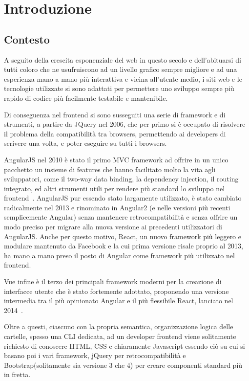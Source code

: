 \chapter{Introduzione}\label{cap:introduzione}

\section{Contesto}\label{sez:contesto}

A seguito della crescita esponenziale del web in questo secolo e dell'abituarsi di tutti coloro che ne usufruiscono ad un livello grafico sempre migliore e ad una esperienza mano a mano pi\`u interattiva e vicina all'utente medio, i siti web e le tecnologie utilizzate si sono adattati per permettere uno sviluppo sempre pi\`u rapido di codice pi\`u facilmente testabile e mantenibile.

Di conseguenza nel frontend si sono susseguiti una serie di framework e di strumenti, a partire da JQuery\cite{jquery} nel 2006, che per primo si \`e occupato di risolvere il problema della compatibilit\`a tra browsers, permettendo ai developers di scrivere una volta, e poter eseguire su tutti i browsers.

AngularJS nel 2010 \`e stato il primo MVC framework ad offrire in un unico pacchetto un insieme di features che hanno facilitato molto la vita agli sviluppatori, come il two-way data binding, la dependency injection, il routing integrato, ed altri strumenti utili per rendere pi\`u standard lo sviluppo nel frontend~\cite{Hoff}.
AngularJS pur essendo stato largamente utilizzato, \`e stato cambiato radicalmente nel 2013 e rinominato in Angular2 (e nelle versioni pi\`u recenti semplicemente Angular) senza mantenere retrocompatibilit\`a e senza offrire un modo preciso per migrare alla nuova versione ai precedenti utilizzatori di AngularJS.
Anche per questo motivo, React, un nuovo framework pi\`u leggero e modulare mantenuto da Facebook e la cui prima versione risale proprio al 2013, ha mano a mano preso il posto di Angular come framework pi\`u utilizzato nel frontend.

Vue infine \`e il terzo dei principali framework moderni per la creazione di interfacce utente che \`e stato fortemente adottato, proponendo una versione intermedia tra il pi\`u opinionato Angular e il pi\`u flessibile React, lanciato nel 2014~\cite{vueJs}.

Oltre a questi, ciascuno con la propria semantica, organizzazione logica delle cartelle, spesso una CLI dedicata, ad un developer frontend viene solitamente richiesto di conoscere HTML, CSS e chiaramente Javascript essendo ci\`o su cui si basano poi i vari framework, jQuery per retrocompatibilit\`a e Bootstrap(solitamente sia versione 3 che 4) per creare componenti standard pi\`u in fretta.


